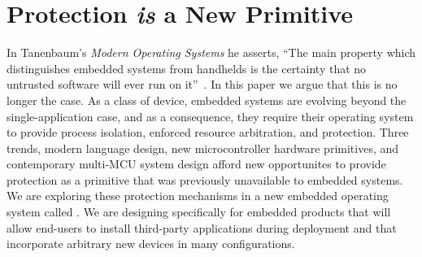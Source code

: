 \section{Protection \emph{is} a New Primitive}

In Tanenbaum's \emph{Modern Operating Systems} he asserts, ``The main property
which distinguishes embedded systems from handhelds is the certainty that no
untrusted software will ever run on it''~\cite{tanenbaum}. In this paper we
argue that this is no longer the case. As a class of device, embedded systems
are evolving beyond the single-application case, and as a consequence, they
require their operating system to provide process isolation, enforced resource
arbitration, and protection.
%
Three trends, modern language design, new microcontroller hardware primitives,
and contemporary multi-MCU system design afford new opportunites to provide
protection as a primitive that was previously unavailable to embedded systems.
We are exploring these protection mechanisms in a new embedded operating system
called \name. We are designing \name specifically for embedded products that
will allow end-users to install third-party applications during deployment and
that incorporate arbitrary new devices in many configurations.








